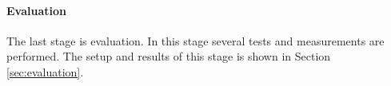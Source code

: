 \paragraph{Evaluation} The last stage is evaluation. In this stage several tests and measurements are performed. The setup and results of this stage is shown in Section \ref{sec:evaluation}.


